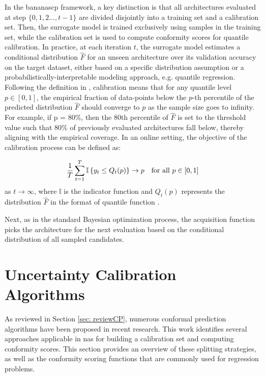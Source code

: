 {{In the \gls{bananascp} framework, a key distinction is that all architectures evaluated at step $\{0, 1, 2..., t-1\}$ are divided disjointly into a training set and a calibration set. Then, the surrogate model is trained exclusively using samples in the training set, while the calibration set is used to compute conformity scores for quantile calibration. In practice, at each iteration $t$, the surrogate model estimates a conditional distribution $\hat{F}$ for an unseen architecture over its validation accuracy on the target dataset, either based on a specific distribution assumption or a probabilistically-interpretable modeling approach, e.g. quantile regression. Following the definition in \cite{deshpande2024online, pmlr-v80-kuleshov18a}, calibration means that for any quantile level $p\in [0, 1]$, the empirical fraction of data-points below the $p$-th percentile of the predicted distribution $\hat{F}$ should converge to $p$ as the sample size goes to infinity. For example, if p = 80\%, then the 80th percentile of $\hat{F}$ is set to the threshold value such that 80\% of previously evaluated architectures fall below, thereby aligning with the empirical coverage. In an online setting, the objective of the calibration process can be defined as:

\begin{equation}
\frac{1}{T} \sum_{t=1}^{T} \mathbb{I} \left\{ y_t \leq Q_t(p) \right\} \rightarrow p \quad \text{for all } p \in [0,1]
\vspace{1em}
\end{equation}
as $t \rightarrow \infty$, where $\mathbb{I}$ is the indicator function and $Q_t(p)$ represents the distribution $\hat{F}$ in the format of quantile function \cite{deshpande2024online, pmlr-v80-kuleshov18a}. 

Next, as in the standard  Bayesian optimization process, the acquisition function picks the architecture for the next evaluation based on the conditional distribution of all sampled candidates.

\section{Uncertainty Calibration Algorithms}
\label{sec:cp}
As reviewed in Section \ref{sec: reviewCP}, numerous conformal prediction algorithms have been proposed in recent research. This work identifies several approaches applicable in \gls{nas} for building a calibration set and computing conformity scores. This section provides an overview of these splitting strategies, as well as the conformity scoring functions that are commonly used for regression problems.
}}
